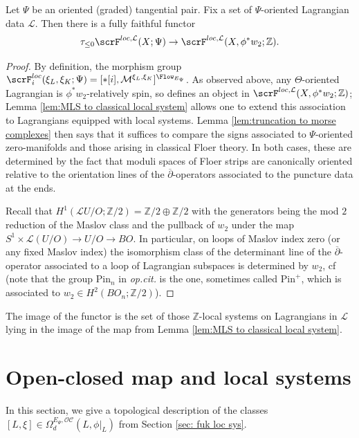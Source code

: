 \documentclass{TPmod}
\def\bZ{\mathbb{Z}}
\newcommand{\cC}{\mathcal{C}}
\newcommand{\cL}{\mathcal{L}}
\newcommand{\cM}{\mathcal{M}}
\newcommand{\cO}{\mathcal{O}}
\def\bZ{\mathbb{Z}}
\numberwithin{equation}{section}
\begin{document}
\begin{prop}\label{prop:spectral to ordinary}
    Let $\Psi$ be an oriented (graded) tangential pair. Fix a set of $\Psi$-oriented Lagrangian data $\cL$. Then there  is a fully faithful functor
    \[
    \tau_{\leq 0} \scrF^{loc,\cL}(X;\Psi) \to \scrF^{loc,\cL}(X,\phi^*w_2;\bZ).
    \]
\end{prop}

\begin{proof}
By definition, the morphism group $\scrF_i^{loc}(\xi_L,\xi_K;\Psi) = [\ast[i],\cM^{\xi_L,\xi_K}]^{\Flow_{E_{\Psi}}}$. As observed above, any $\Theta$-oriented Lagrangian is $\phi^*w_2$-relatively spin, so defines an object in $\scrF^{loc,\cL}(X,\phi^*w_2;\bZ)$; Lemma \ref{lem:MLS to classical local system} allows one to extend this association to Lagrangians equipped with local systems. Lemma \ref{lem:truncation to morse complexes} then says that it suffices to compare the signs associated to $\Psi$-oriented zero-manifolds and those arising in classical Floer theory. In both cases, these are determined by the fact that moduli spaces of Floer strips are canonically oriented relative to the orientation lines of the $\overline{\partial}$-operators associated to the puncture data at the ends.


Recall that $H^1(\mathcal{L} U/O;\bZ/2) = \bZ/2 \oplus \bZ/2$ with the generators being the mod $2$ reduction of the Maslov class and the pullback of $w_2$ under the map $S^1 \times \mathcal{L}(U/O) \to U/O \to BO$. In particular, on loops of Maslov index zero (or any fixed Maslov index) the isomorphism class of the determinant line of the $\overline{\partial}$-operator associated to a loop of Lagrangian subspaces is determined by $w_2$, cf \cite[Lemmas 11.7 \& 11.17]{Seidel:book} (note that the group $\mathrm{Pin}_n$ in \emph{op.cit.} is the one, sometimes called $\mathrm{Pin}^+$, which is associated to $w_2 \in H^2(BO_n;\bZ/2)$).
\end{proof}

   The image of the functor is the set of those $\bZ$-local systems on Lagrangians in $\cL$ lying in the image of the map from Lemma \ref{lem:MLS to classical local system}. 

\section{Open-closed map and local systems}\label{sec: OC}

    In this section, we give a topological description of the classes $[L, \xi] \in \Omega^{E_\Psi,\cO\cC}_d(L, \phi|_L)$ from Section \ref{sec: fuk loc sys}.
\end{document}
